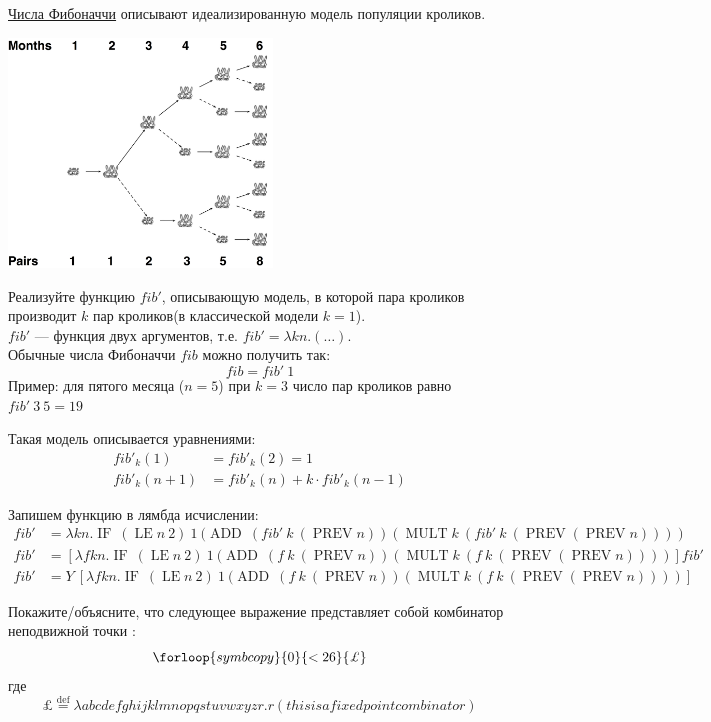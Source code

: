 \documentclass[a4paper,12pt]{article}
\newcounter{zcounter}
\newcommand{\z}{\par\addtocounter{zcounter}{1}%
\textsc{\fbox{\textbf{FP\arabic{zcounter}}}\quad} }
\newcounter{symbcopy}
\newcommand{\nsymbl}[2]{
  \forloop{symbcopy}{0}{\value{symbcopy} < #2}{#1}
}
\newcommand{\eqdef}{\stackrel{\mathrm{def}}{=}}
\DeclareMathOperator{\MULT}{MULT}
\DeclareMathOperator{\ADD}{ADD}
\DeclareMathOperator{\LE}{LE}
\DeclareMathOperator{\PREV}{PREV}
\begin{document}
\z \href{https://en.wikipedia.org/wiki/Fibonacci_number}{Числа Фибоначчи} описывают идеализированную модель популяции кроликов.
\begin{center}
\includegraphics[width=7cm]{fib.png}    
\end{center}
Реализуйте функцию $fib'$, описывающую модель, в которой пара кроликов производит $k$ пар кроликов(в классической модели $k=1$). \\
$fib'$ --- функция двух аргументов, т.е. $fib' = \lambda kn.(\ldots)$.\\
Обычные числа Фибоначчи $fib$ можно получить так:
\[
    fib = fib'\: 1
\]
Пример: для пятого месяца ($n=5$) при $k=3$ число пар кроликов равно $fib'\: 3 \:5 = 19$
\hfill\break

Такая модель описывается уравнениями:
\begin{align*}
    fib'_k (1) &= fib'_k (2) = 1 \\
    fib'_k (n + 1) &= fib'_k (n) + k \cdot fib'_k(n - 1)
\end{align*}

Запишем функцию в лямбда исчислении:
\begin{align*}
    fib' &= \lambda kn.\operatorname{IF} \: (\LE n \: 2) \: 1 \: (\ADD \: (fib' \: k \: (\PREV n)) 
    (\MULT k \: (fib' \: k \: (\PREV (\PREV n)))) \\
    fib' &= [\lambda fkn.\operatorname{IF} \: (\LE n \: 2) \: 1 \: (\ADD \: (f \: k \: (\PREV n)) 
    (\MULT k \: (f \: k \: (\PREV (\PREV n)))) ] fib' \\
    fib' &= Y \: [\lambda fkn.\operatorname{IF} \: (\LE n \: 2) \: 1 \: (\ADD \: (f \: k \: (\PREV n)) 
    (\MULT k \: (f \: k \: (\PREV (\PREV n)))) ] 
\end{align*}


\z Покажите/объясните, что следующее выражение представляет собой комбинатор
неподвижной точки :
\[
\nsymbl{\pounds}{26}
\]
где
\[
\pounds \eqdef \lambda abcdefghijklmnopqstuvwxyzr.r(thisisafixedpointcombinator)
\]
\hfill\break
\end{document}

